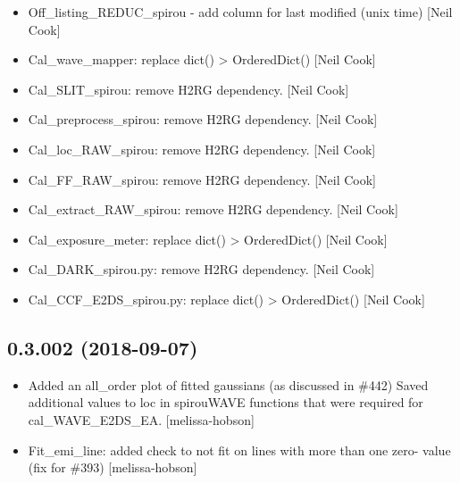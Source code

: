 \documentclass[a4paper,10pt,english]{report}
\begin{document}
\begin{itemize}
\item {} 
Off\_listing\_REDUC\_spirou - add column for last modified (unix time)
{[}Neil Cook{]}

\item {} 
Cal\_wave\_mapper: replace dict() \textendash{}\textgreater{} OrderedDict() {[}Neil Cook{]}

\item {} 
Cal\_SLIT\_spirou: remove H2RG dependency. {[}Neil Cook{]}

\item {} 
Cal\_preprocess\_spirou: remove H2RG dependency. {[}Neil Cook{]}

\item {} 
Cal\_loc\_RAW\_spirou: remove H2RG dependency. {[}Neil Cook{]}

\item {} 
Cal\_FF\_RAW\_spirou: remove H2RG dependency. {[}Neil Cook{]}

\item {} 
Cal\_extract\_RAW\_spirou: remove H2RG dependency. {[}Neil Cook{]}

\item {} 
Cal\_exposure\_meter: replace dict() \textendash{}\textgreater{} OrderedDict() {[}Neil Cook{]}

\item {} 
Cal\_DARK\_spirou.py: remove H2RG dependency. {[}Neil Cook{]}

\item {} 
Cal\_CCF\_E2DS\_spirou.py: replace dict() \textendash{}\textgreater{} OrderedDict() {[}Neil Cook{]}

\end{itemize}


\subsection{0.3.002 (2018-09-07)}
\label{\detokenize{misc/changelog:id331}}\begin{itemize}
\item {} 
Added an all\_order plot of fitted gaussians (as discussed in \#442)
Saved additional values to loc in spirouWAVE functions that were
required for cal\_WAVE\_E2DS\_EA. {[}melissa-hobson{]}

\item {} 
Fit\_emi\_line: added check to not fit on lines with more than one zero-
value (fix for \#393) {[}melissa-hobson{]}

\end{itemize}
\end{document}
